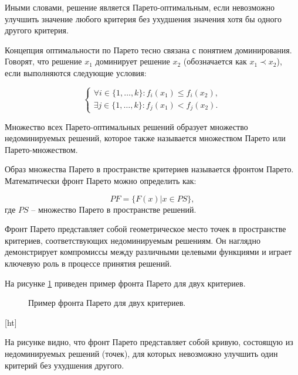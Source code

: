 Иными словами, решение является Парето-оптимальным, если невозможно
улучшить значение любого критерия без ухудшения значения хотя бы одного другого критерия.

Концепция оптимальности по Парето тесно связана с понятием доминирования.
Говорят, что решение $x_1$ доминирует решение $x_2$ (обозначается как $x_1 \prec x_2$), если выполняются следующие условия:

\begin{equation*}
    \label{eq:dominance}
    \begin{cases}
        \forall i \in \{1, \ldots, k\}: f_i(x_1) \leq f_i(x_2), \\
        \exists j \in \{1, \ldots, k\}: f_j(x_1) < f_j(x_2).
    \end{cases}
\end{equation*}

Множество всех Парето-оптимальных решений образует множество
недоминируемых решений, которое также называется множеством Парето или Парето-множеством.

Образ множества Парето в пространстве критериев называется фронтом Парето. Математически фронт Парето можно определить как:

\begin{equation*}
    PF = \{F(x) | x \in PS\},
\end{equation*}
где $PS$ -- множество Парето в пространстве решений.

Фронт Парето представляет собой геометрическое место точек \cite*{coello2007evolutionary} в
пространстве критериев, соответствующих недоминируемым решениям.
Он наглядно демонстрирует компромиссы между различными целевыми
функциями и играет ключевую роль в процессе принятия решений.

На рисунке \ref{fig:pareto_front_example} приведен пример фронта Парето для двух критериев.

\begin{figure}[ht]
    \caption{Пример фронта Парето для двух критериев.}\label{fig:pareto_front_example}
\end{figure}[ht]

На рисунке видно, что фронт Парето представляет собой кривую, состоящую из
недоминируемых решений
(точек), для которых невозможно улучшить один критерий без ухудшения другого.

